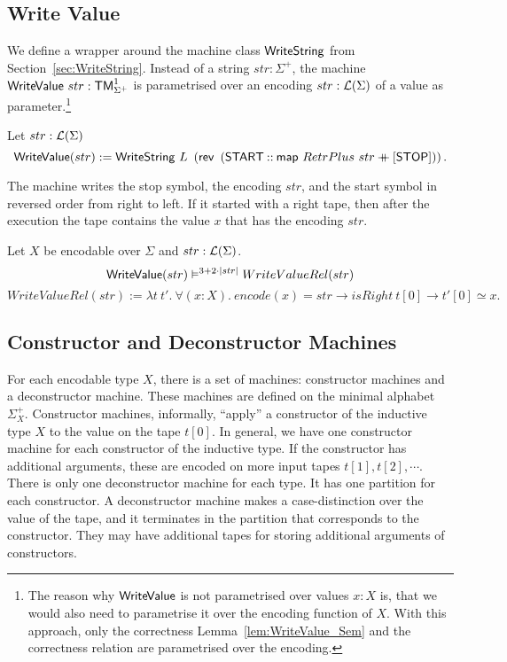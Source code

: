 \subsection{Write Value}
\label{sec:WriteValue}
%

We define a wrapper around the machine class $\mathsf{WriteString}$ from Section~\ref{sec:WriteString}.  Instead of a string $str : \Sigma^+$, the machine
$\mathsf{WriteValue}~str : \mathsf{TM}_{\Sigma^+}^1$ is parametrised over an encoding $str:\mathcal{L}(\Sigma)$ of a value as parameter.\footnote{The reason why
  $\MS{WriteValue}$ is not parametrised over values $x:X$ is, that we would also need to parametrise it over the encoding function of $X$.  With this
  approach, only the correctness Lemma~\ref{lem:WriteValue_Sem} and the correctness relation are parametrised over the encoding.}
\begin{definition}[$\MS{WriteValue}$][WriteValue]
  \label{def:WriteValue}
  Let $str:\mathcal{L}(\Sigma)$
  \[
    \mathsf{WriteValue}(str) := \mathsf{WriteString}~L~\left(\mathsf{rev}~\left(\mathsf{START} \mathbin{::} \mathsf{map}~RetrPlus~str \mathbin{+\mkern-10mu+} [\mathsf{STOP}]\right)\right).
  \]
\end{definition}
The machine writes the stop symbol, the encoding $str$, and the start symbol in reversed order from right to left.  If it started with a right tape,
then after the execution the tape contains the value $x$ that has the encoding $str$.
\begin{lemma}
  \label{lem:WriteValue_Sem}
  Let $X$ be encodable over $\Sigma$ and $str : \mathcal{L}(\Sigma)$.
  \[
    \mathsf{WriteValue}(str) \mathrel{\vDash^{3 + 2 \cdot \left| str \right|}} WriteValueRel(str)
  \]
  \[
    WriteValueRel(str) := \lambda t~t'.~\forall (x:X).~encode(x) = str \rightarrow isRight~t[0] \rightarrow t'[0] \simeq x.
  \]
\end{lemma}


\subsection{Constructor and Deconstructor Machines}
\label{sec:constructors-deconstructors}


For each encodable type $X$, there is a set of machines: constructor machines and a deconstructor machine.  These machines are defined on the minimal
alphabet $\Sigma_X^+$.  Constructor machines, informally, ``apply'' a constructor of the inductive type $X$ to the value on the tape $t[0]$.  In
general, we have one constructor machine for each constructor of the inductive type.  If the constructor has additional arguments, these are encoded
on more input tapes $t[1], t[2], \cdots$.  There is only one deconstructor machine for each type.  It has one partition for each constructor.  A
deconstructor machine makes a case-distinction over the value of the tape, and it terminates in the partition that corresponds to the constructor.
They may have additional tapes for storing additional arguments of constructors.

